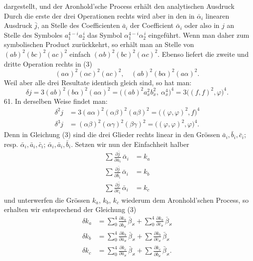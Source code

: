 dargestellt, und der Aronhold'sche Process erhält den analytischen Ausdruck
Durch die erste der drei Operationen rechts wird aber in den in $\bar\alpha_i$ linearen Ausdruck $\bar j$, an Stelle des Coefficienten $\bar a_i$ der Coefficient $\bar\alpha_i$ oder also in $j$ an Stelle des Symboles $a_1^{4-i}a_2^{\,i}$ das Symbol $\alpha_1^{4-i}\alpha_2^{\,i}$ eingeführt. Wenn man daher zum symbolischen Product zurückkehrt, so erhält man an Stelle von $(ab)^2(bc)^2(ac)^2$ einfach $(\alpha b)^2(bc)^2(\alpha c)^2$.
Ebenso liefert die zweite und dritte Operation rechts in (3)
\[
(a\alpha)^2(\alpha c)^2(ac)^2, \quad (ab)^2(b\alpha)^2(a\alpha)^2.
\]
Weil aber alle drei Resultate identisch gleich sind, so hat man:
\[
\delta j = 3(ab)^2(b\alpha)^2(a\alpha)^2 = \big((ab)^2a_x^2b_x^2,\ \alpha_x^4\big)^4 = 3\big((f,f)^2,\varphi\big)^4.
\]
61. In derselben Weise findet man:
\[
\begin{aligned}
\delta^2 j &= 3(a\alpha)^2(\alpha\beta)^2(a\beta)^2 = \big((\varphi,\varphi)^2,f\big)^4\\
\delta^3 j &= (\alpha\beta)^2(\alpha\gamma)^2(\beta\gamma)^2 = \big((\varphi,\varphi)^2,\varphi\big)^4.
\end{aligned}
\]
Denn in Gleichung (3) sind die drei Glieder rechts linear in den Grössen $\bar a_i, \bar b_i, \bar c_i$; resp. $\bar\alpha_i, \bar a_i, \bar c_i$; $\bar\alpha_i, \bar a_i, \bar b_i$. Setzen wir nun der Einfachheit halber
\[
\begin{aligned}
\sum \frac{\partial \bar j}{\partial \bar a_i}\,\bar\alpha_i &= k_a\\
\sum \frac{\partial \bar j}{\partial \bar b_i}\,\bar\alpha_i &= k_b\\
\sum \frac{\partial \bar j}{\partial \bar c_i}\,\bar\alpha_i &= k_c
\end{aligned}
\]
und unterwerfen die Grössen $k_a$, $k_b$, $k_c$ wiederum dem Aronhold'schen Process, so erhalten wir entsprechend der Gleichung (3)
\[
\begin{aligned}
\delta k_a &= \sum_0^4 \frac{\partial k_a}{\partial \bar b_\varkappa}\,\bar\beta_\varkappa + \sum_0^4 \frac{\partial k_a}{\partial \bar c_\varkappa}\,\bar\beta_\varkappa\\
\delta k_b &= \sum_0^4 \frac{\partial k_b}{\partial \bar a_\varkappa}\,\bar\beta_\varkappa + \sum \frac{\partial k_b}{\partial \bar c_\varkappa}\,\bar\beta_\varkappa\\
\delta k_c &= \sum_0^4 \frac{\partial k_c}{\partial \bar a_\varkappa}\,\bar\beta_\varkappa + \sum \frac{\partial k_c}{\partial \bar b_\varkappa}\,\bar\beta_\varkappa.
\end{aligned}
\]


